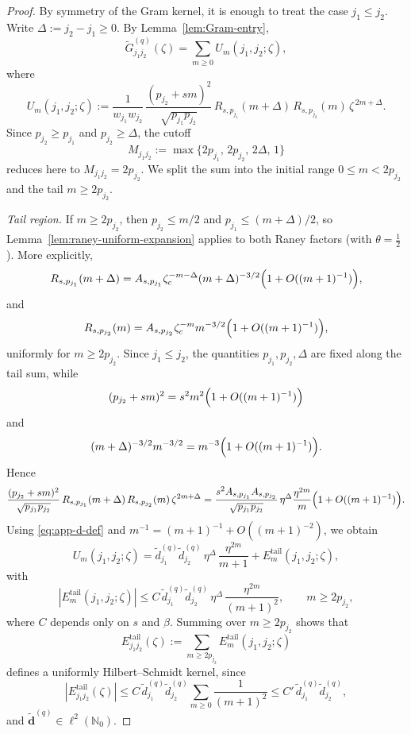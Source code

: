 \documentclass[11pt]{amsart}
\numberwithin{equation}{section}
\theoremstyle{plain}
\theoremstyle{definition}
\theoremstyle{remark}
\newcommand{\NN}{\mathbb{N}}
\begin{document}
\begin{proof}
	By symmetry of the Gram kernel, it is enough to treat the case \(j_1\le j_2\). Write \(\Delta:=j_2-j_1\ge0\).  By
	Lemma~\ref{lem:Gram-entry},
	\[
		\widetilde G^{(q)}_{j_1j_2}(\zeta)=\sum_{m\ge0}U_m(j_1,j_2;\zeta),
	\]
	where
	\[
		U_{m}(j_1,j_2;\zeta)
		:=
		\frac{1}{w_{j_1}w_{j_2}}\,
		\frac{(p_{j_2}+sm)^{2}}{\sqrt{p_{j_1}p_{j_2}}}\,
		R_{s,p_{j_1}}(m+\Delta)\,R_{s,p_{j_2}}(m)\,\zeta^{\,2m+\Delta}.
	\]
	Since \(p_{j_2}\ge p_{j_1}\) and \(p_{j_2}\ge \Delta\), the cutoff
	\[
		M_{j_1j_2}:=\max\{2p_{j_1},\,2p_{j_2},\,2\Delta,\,1\}
	\]
	reduces here to \(M_{j_1j_2}=2p_{j_2}\).  We split the sum into the initial
	range \(0\le m<2p_{j_2}\) and the tail \(m\ge2p_{j_2}\).


	\smallskip
	\noindent\emph{Tail region.}
	If \(m\ge2p_{j_2}\), then \(p_{j_2}\le m/2\) and
	\(p_{j_1}\le (m+\Delta)/2\), so Lemma~\ref{lem:raney-uniform-expansion}
	applies to both Raney factors (with \(\theta=\frac12\)). More explicitly,
	\[
		R_{s,p_{j_1}}(m+\Delta)
		=
		A_{s,p_{j_1}}\zeta_c^{-m-\Delta}(m+\Delta)^{-3/2}
		\Bigl(1+O((m+1)^{-1})\Bigr),
	\]
	and
	\[
		R_{s,p_{j_2}}(m)
		=
		A_{s,p_{j_2}}\zeta_c^{-m}m^{-3/2}
		\Bigl(1+O((m+1)^{-1})\Bigr),
	\]
	uniformly for \(m\ge2p_{j_2}\). Since \(j_1\le j_2\), the quantities
	\(p_{j_1},p_{j_2},\Delta\) are fixed along the tail sum, while
	\[
		(p_{j_2}+sm)^2=s^2m^2\Bigl(1+O((m+1)^{-1})\Bigr)
	\]
	and
	\[
		(m+\Delta)^{-3/2}m^{-3/2}
		=
		m^{-3}\Bigl(1+O((m+1)^{-1})\Bigr).
	\]
	Hence
	\[
		\frac{(p_{j_2}+sm)^2}{\sqrt{p_{j_1}p_{j_2}}}\,
		R_{s,p_{j_1}}(m+\Delta)\,R_{s,p_{j_2}}(m)\,\zeta^{2m+\Delta}
		=
		\frac{s^2A_{s,p_{j_1}}A_{s,p_{j_2}}}{\sqrt{p_{j_1}p_{j_2}}}\,
		\eta^\Delta\frac{\eta^{2m}}{m}
		\Bigl(1+O((m+1)^{-1})\Bigr).
	\]
	Using \eqref{eq:app-d-def} and \(m^{-1}=(m+1)^{-1}+O((m+1)^{-2})\), we
	obtain
	\begin{equation}\label{eq:Sm-decomp}
		U_m(j_1,j_2;\zeta)
		=
		\widetilde d^{(q)}_{j_1}\widetilde d^{(q)}_{j_2}\,\eta^{\Delta}\,
		\frac{\eta^{2m}}{m+1}
		+E_m^{\mathrm{tail}}(j_1,j_2;\zeta),
	\end{equation}
	with
	\begin{equation}\label{eq:Sm-error}
		|E_m^{\mathrm{tail}}(j_1,j_2;\zeta)|
		\le
		C\,\widetilde d^{(q)}_{j_1}\widetilde d^{(q)}_{j_2}\,\eta^{\Delta}\,
		\frac{\eta^{2m}}{(m+1)^2},
		\qquad m\ge 2p_{j_2},
	\end{equation}
	where \(C\) depends only on \(s\) and \(\beta\).  Summing over \(m\ge2p_{j_2}\)
	shows that
	\[
		E^{\mathrm{tail}}_{j_1j_2}(\zeta)
		:=\sum_{m\ge2p_{j_2}}E_m^{\mathrm{tail}}(j_1,j_2;\zeta)
	\]
	defines a uniformly Hilbert--Schmidt kernel, since
	\[
		|E^{\mathrm{tail}}_{j_1j_2}(\zeta)|
		\le
		C\,\widetilde d^{(q)}_{j_1}\widetilde d^{(q)}_{j_2}
		\sum_{m\ge0}\frac{1}{(m+1)^2}
		\le
		C'\,\widetilde d^{(q)}_{j_1}\widetilde d^{(q)}_{j_2},
	\]
	and \(\widetilde{\bm d}^{(q)}\in\ell^2(\NN_0)\).



\end{proof}
\end{document}
